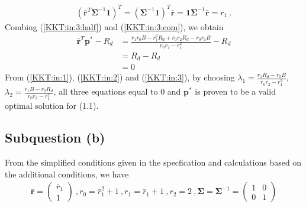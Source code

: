 \documentclass[12pt]{ftec2101}
\newcommand{\matr}[1]{\mathbf{#1}}
\newcommand{\vect}[1]{\mathbf{#1}}
\begin{document}
\begin{align}
    (\bar{\vect{r}}^T \matr{\Sigma}^{-1} \vect{1})^T = (\matr{\Sigma}^{-1} \vect{1})^T \bar{\vect{r}} = \vect{1} \matr{\Sigma}^{-1} \bar{\vect{r}} = r_1 \ .
    \label{KKT:in:3:com}
\end{align}
Combing (\ref{KKT:in:3:half}) and (\ref{KKT:in:3:com}), we obtain
\begin{align}
    \bar{\vect{r}}^T \vect{p}^{*} -R_d &= \frac{r_1 r_0 B - r_1^2 R_d + r_0 r_2 R_d - r_0 r_1 B}{r_0 r_2 - r_1^2} - R_d \\
    &= R_d - R_d \\ 
    &= 0
    \label{KKT:in:3}
\end{align}
\noindent
From (\ref{KKT:in:1}), (\ref{KKT:in:2}) and (\ref{KKT:in:3}), by choosing $\lambda_1 = \frac{r_1 R_d- r_0 B}{r_0 r_2 -r_1^2}$, $\lambda_2 = \frac{r_1 B - r_2 R_d}{r_0 r_2 -r_1^2}$, all three equations equal to $0$ and $\vect{p}^{*}$ is proven to be a valid optimal solution for (1.1).
\subsection{Subquestion (b)}
From the simplified conditions given in the specfication and calculations based on the additional conditions, we have 
\begin{align*}
    \bar{\vect{r}} =
    \begin{pmatrix}
        \bar{r}_1 \\
        1
    \end{pmatrix}\ ,
    r_0 = \bar{r}_1^2+1\ ,
    r_1 = \bar{r}_1 + 1\ , 
    r_2 = 2\ ,
    \matr{\Sigma} = \matr{\Sigma}^{-1} =
    \begin{pmatrix}
        1 & 0 \\
        0 & 1
    \end{pmatrix}
\end{align*}
\end{document}

